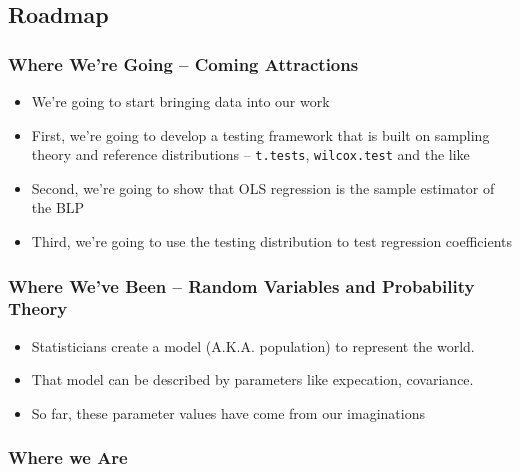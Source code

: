 \documentclass[
]{book}
\providecommand{\tightlist}{%
  \setlength{\itemsep}{0pt}\setlength{\parskip}{0pt}}
\theoremstyle{definition}
\theoremstyle{definition}
\theoremstyle{definition}
\theoremstyle{definition}
\theoremstyle{remark}
\begin{document}
\hypertarget{roadmap-1}{%
\subsection{Roadmap}\label{roadmap-1}}

\hypertarget{where-were-going-coming-attractions}{%
\subsubsection{Where We're Going -- Coming Attractions}\label{where-were-going-coming-attractions}}

\begin{itemize}
\tightlist
\item
  We're going to start bringing data into our work
\item
  First, we're going to develop a testing framework that is built on sampling theory and reference distributions -- \texttt{t.tests}, \texttt{wilcox.test} and the like
\item
  Second, we're going to show that OLS regression is the sample estimator of the BLP
\item
  Third, we're going to use the testing distribution to test regression coefficients
\end{itemize}

\hypertarget{where-weve-been-random-variables-and-probability-theory}{%
\subsubsection{Where We've Been -- Random Variables and Probability Theory}\label{where-weve-been-random-variables-and-probability-theory}}

\begin{itemize}
\tightlist
\item
  Statisticians create a model (A.K.A. population) to represent the world.
\item
  That model can be described by parameters like expecation, covariance.
\item
  So far, these parameter values have come from our imaginations
\end{itemize}

\hypertarget{where-we-are}{%
\subsubsection{Where we Are}\label{where-we-are}}
\end{document}
